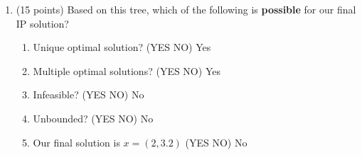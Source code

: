 \documentclass[letterpaper,oneside,12pt]{article}%
\newcommand{\blu}{\color{blue}}
\begin{document}
\begin{enumerate}
\begin{enumerate}
{\blu
We'd add constraints $y \leq 4$ and $y \geq 5$
}	
	\vfill
	\end{enumerate}
\item (15 points) Based on this tree, which of the following is \textbf{possible} for our final IP solution?
	\begin{enumerate}
	\item Unique optimal solution? (YES \hspace{0.5cm} NO)
	{\blu
Yes
}
	\item Multiple optimal solutions? (YES \hspace{0.5cm} NO)
	{\blu
Yes
}
	\item Infeasible? (YES \hspace{0.5cm} NO)
	{\blu
No
}
	\item Unbounded? (YES \hspace{0.5cm} NO)
	{\blu
No
}
	\item Our final solution is $x = (2,3.2)$ (YES \hspace{0.5cm} NO)
{\blu
No
}
	\end{enumerate}
\end{enumerate}
\end{document}
